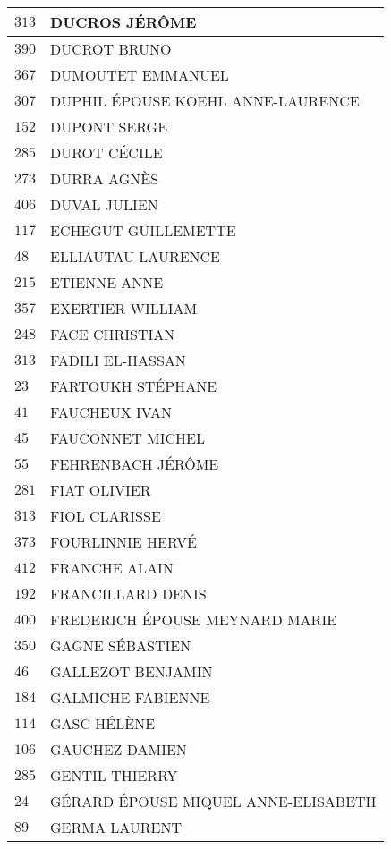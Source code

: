 \begin{xltabular}{\linewidth}{|l|X|}
    \hline
    $313$ & DUCROS JÉRÔME \\
    \hline
    $390$ & DUCROT BRUNO \\
    \hline
    $367$ & DUMOUTET EMMANUEL \\
    \hline
    $307$ & DUPHIL ÉPOUSE KOEHL ANNE-LAURENCE \\
    \hline
    $152$ & DUPONT SERGE \\
    \hline
    $285$ & DUROT CÉCILE \\
    \hline
    $273$ & DURRA AGNÈS \\
    \hline
    $406$ & DUVAL JULIEN \\
    \hline
    $117$ & ECHEGUT GUILLEMETTE \\
    \hline
    $48$ & ELLIAUTAU LAURENCE \\
    \hline
    $215$ & ETIENNE ANNE \\
    \hline
    $357$ & EXERTIER WILLIAM \\
    \hline
    $248$ & FACE CHRISTIAN \\
    \hline
    $313$ & FADILI EL-HASSAN \\
    \hline
    $23$ & FARTOUKH STÉPHANE \\
    \hline
    $41$ & FAUCHEUX IVAN \\
    \hline
    $45$ & FAUCONNET MICHEL \\
    \hline
    $55$ & FEHRENBACH JÉRÔME \\
    \hline
    $281$ & FIAT OLIVIER \\
    \hline
    $313$ & FIOL CLARISSE \\
    \hline
    $373$ & FOURLINNIE HERVÉ \\
    \hline
    $412$ & FRANCHE ALAIN \\
    \hline
    $192$ & FRANCILLARD DENIS \\
    \hline
    $400$ & FREDERICH ÉPOUSE MEYNARD MARIE \\
    \hline
    $350$ & GAGNE SÉBASTIEN \\
    \hline
    $46$ & GALLEZOT BENJAMIN \\
    \hline
    $184$ & GALMICHE FABIENNE \\
    \hline
    $114$ & GASC HÉLÈNE \\
    \hline
    $106$ & GAUCHEZ DAMIEN \\
    \hline
    $285$ & GENTIL THIERRY \\
    \hline
    $24$ & GÉRARD ÉPOUSE MIQUEL ANNE-ELISABETH \\
    \hline
    $89$ & GERMA LAURENT \\

\end{xltabular}
